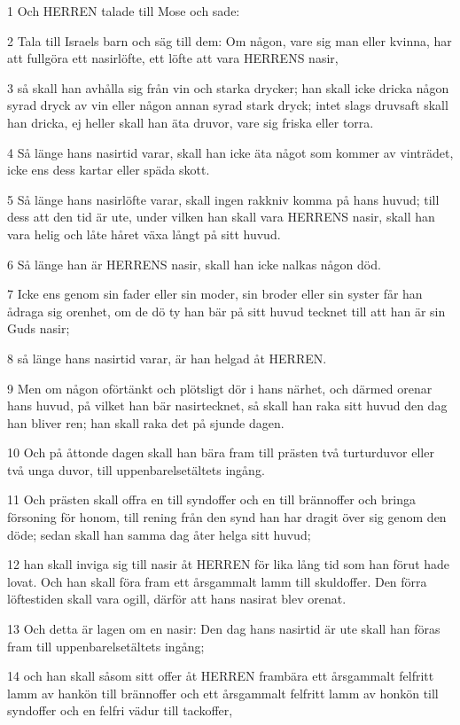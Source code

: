 \par 1 Och HERREN talade till Mose och sade:
\par 2 Tala till Israels barn och säg till dem: Om någon, vare sig man eller kvinna, har att fullgöra ett nasirlöfte, ett löfte att vara HERRENS nasir,
\par 3 så skall han avhålla sig från vin och starka drycker; han skall icke dricka någon syrad dryck av vin eller någon annan syrad stark dryck; intet slags druvsaft skall han dricka, ej heller skall han äta druvor, vare sig friska eller torra.
\par 4 Så länge hans nasirtid varar, skall han icke äta något som kommer av vinträdet, icke ens dess kartar eller späda skott.
\par 5 Så länge hans nasirlöfte varar, skall ingen rakkniv komma på hans huvud; till dess att den tid är ute, under vilken han skall vara HERRENS nasir, skall han vara helig och låte håret växa långt på sitt huvud.
\par 6 Så länge han är HERRENS nasir, skall han icke nalkas någon död.
\par 7 Icke ens genom sin fader eller sin moder, sin broder eller sin syster får han ådraga sig orenhet, om de dö ty han bär på sitt huvud tecknet till att han är sin Guds nasir;
\par 8 så länge hans nasirtid varar, är han helgad åt HERREN.
\par 9 Men om någon oförtänkt och plötsligt dör i hans närhet, och därmed orenar hans huvud, på vilket han bär nasirtecknet, så skall han raka sitt huvud den dag han bliver ren; han skall raka det på sjunde dagen.
\par 10 Och på åttonde dagen skall han bära fram till prästen två turturduvor eller två unga duvor, till uppenbarelsetältets ingång.
\par 11 Och prästen skall offra en till syndoffer och en till brännoffer och bringa försoning för honom, till rening från den synd han har dragit över sig genom den döde; sedan skall han samma dag åter helga sitt huvud;
\par 12 han skall inviga sig till nasir åt HERREN för lika lång tid som han förut hade lovat. Och han skall föra fram ett årsgammalt lamm till skuldoffer. Den förra löftestiden skall vara ogill, därför att hans nasirat blev orenat.
\par 13 Och detta är lagen om en nasir: Den dag hans nasirtid är ute skall han föras fram till uppenbarelsetältets ingång;
\par 14 och han skall såsom sitt offer åt HERREN frambära ett årsgammalt felfritt lamm av hankön till brännoffer och ett årsgammalt felfritt lamm av honkön till syndoffer och en felfri vädur till tackoffer,
